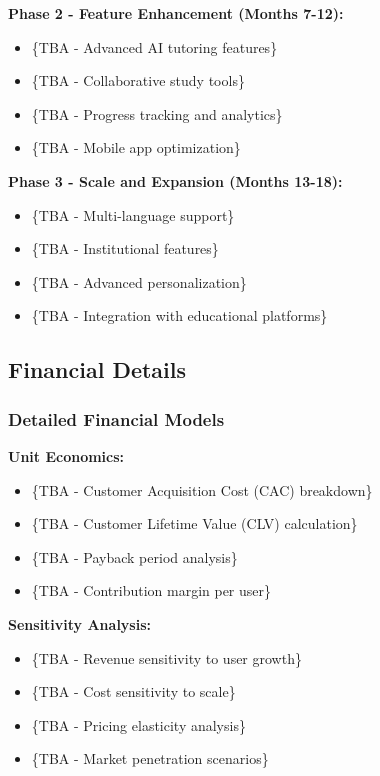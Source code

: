 \textbf{Phase 2 - Feature Enhancement (Months 7-12):}
\begin{itemize}
    \item \{TBA - Advanced AI tutoring features\}
    \item \{TBA - Collaborative study tools\}
    \item \{TBA - Progress tracking and analytics\}
    \item \{TBA - Mobile app optimization\}
\end{itemize}

\textbf{Phase 3 - Scale and Expansion (Months 13-18):}
\begin{itemize}
    \item \{TBA - Multi-language support\}
    \item \{TBA - Institutional features\}
    \item \{TBA - Advanced personalization\}
    \item \{TBA - Integration with educational platforms\}
\end{itemize}

\subsection{Financial Details}
\subsubsection{Detailed Financial Models}
\textbf{Unit Economics:}
\begin{itemize}
    \item \{TBA - Customer Acquisition Cost (CAC) breakdown\}
    \item \{TBA - Customer Lifetime Value (CLV) calculation\}
    \item \{TBA - Payback period analysis\}
    \item \{TBA - Contribution margin per user\}
\end{itemize}

\textbf{Sensitivity Analysis:}
\begin{itemize}
    \item \{TBA - Revenue sensitivity to user growth\}
    \item \{TBA - Cost sensitivity to scale\}
    \item \{TBA - Pricing elasticity analysis\}
    \item \{TBA - Market penetration scenarios\}
\end{itemize}

